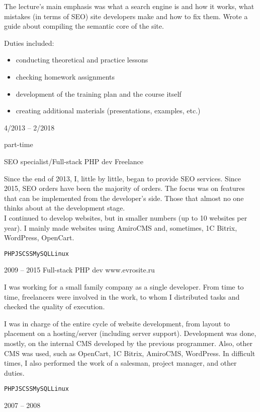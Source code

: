 \begin{entrylist}
{    The lecture's main emphasis was what a search engine is and how it works, what mistakes (in terms of SEO) site developers make and how to fix them. Wrote a guide about compiling the semantic core of the site.

    Duties included:
    \begin{itemize}
      \item conducting theoretical and practice lessons
      \item checking homework assignments
      \item development of the training plan and the course itself
      \item creating additional materials (presentations, examples, etc.)
    \end{itemize}
    }

	\entry
		{4/2013 -- 2/2018

		\footnotesize{part-time}}
		{SEO specialist/Full-stack PHP dev}
		{Freelance}
    {Since the end of 2013, I, little by little, began to provide SEO services. Since 2015, SEO orders have been the majority of orders. The focus was on features that can be implemented from the developer's side. Those that almost no one thinks about at the development stage.\\
    I continued to develop websites, but in smaller numbers (up to 10 websites per year). I mainly made websites using AmiroCMS and, sometimes, 1C Bitrix, WordPress, OpenCart.

		\texttt{PHP}\slashsep\texttt{JS}\slashsep\texttt{CSS}\slashsep\texttt{MySQL}\slashsep\texttt{Linux}}

  \entry
    {2009 -- 2015}
    {Full-stack PHP dev}
    {www.evrosite.ru}
    {I was working for a small family company as a single developer. From time to time, freelancers were involved in the work, to whom I distributed tasks and checked the quality of execution.

    I was in charge of the entire cycle of website development, from layout to placement on a hosting/server (including server support). Development was done, mostly, on the internal CMS developed by the previous programmer. Also, other CMS was used, such as OpenCart, 1C Bitrix, AmiroCMS, WordPress. In difficult times, I also performed the work of a salesman, project manager, and other duties.

    \texttt{PHP}\slashsep\texttt{JS}\slashsep\texttt{CSS}\slashsep\texttt{MySQL}\slashsep\texttt{Linux}}

	\entry
		{2007 -- 2008

}
\end{entrylist}
